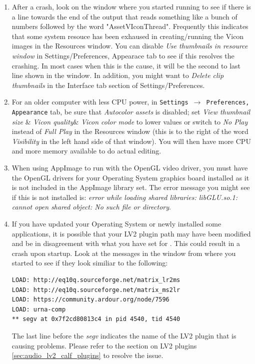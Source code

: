 \begin{enumerate}
	\item After a crash, look on the window where you started running \CGG{} to see if there is a line towards the end of the output that reads something like a bunch of numbers followed by the word "AssetVIconThread".  Frequently this indicates that some system resouce has been exhaused in creating/running the Vicon images in the Resources window.  You can disable \textit{Use thumbnails in resource window} in Settings/Preferences, Appearace tab to see if this resolves the crashing.  In most cases when this is the cause, it will be the second to last line shown in the window.
In addition, you might want to \textit{Delete clip thumbnails} in the Interface
tab section of Settings/Preferences.
	\item For an older computer with less CPU power, in \texttt{Settings $\rightarrow$ Preferences, Appearance} tab, be sure that \textit{Autocolor assets }is disabled; set \textit{View thumbnail size} \& \textit{Vicon quality}\& \textit{Vicon color mode} to lower values or switch to \textit{No Play} instead of \textit{Full Play} in the Resources window (this is to the right of the word \textit{Visibility} in the left hand side of that window). You will then have more CPU and more memory available to do actual editing.
	\item When using AppImage to run with the OpenGL video driver, you must have the OpenGL drivers
for your Operating System graphics board installed as it is not included in the AppImage library set. The
error message you might see if this is not installed is: \textit{error while loading shared libraries: libGLU.so.1: cannot open shared object: No such file or directory}.
	\item If you have updated your Operating System or newly installed some applications, it is
possible that your LV2 plugin path may have been modified and be in disagreement with what you have set
for \CGG{}.  This could result in a crash upon startup.  Look at the messages in the window from where
you started \CGG{} to see if they look similiar to the following:
\begin{lstlisting}[numbers=none,xleftmargin=10mm]
LOAD: http://eq10q.sourceforge.net/matrix_lr2ms
LOAD: http://eq10q.sourceforge.net/matrix_ms2lr
LOAD: https://community.ardour.org/node/7596
LOAD: urna-comp
** segv at 0x7f2cd80813c4 in pid 4540, tid 4540
\end{lstlisting}
The last line before the \textit{segv} indicates the name of the LV2 plugin that is causing problems.
Please refer to the section on LV2 plugins \ref{sec:audio_lv2_calf_plugins} to resolve the issue.

\end{enumerate}
